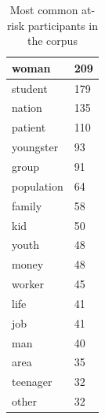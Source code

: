 \begin{table}[htb!]
{\begin{minipage}{.37\textwidth}
\begin{tabularx}{1.0\textwidth}{|X|l|}
    woman      & 209   \\ \hline
    student    & 179   \\ \hline
    nation     & 135   \\ \hline
    patient    & 110   \\ \hline
    youngster  & 93    \\ \hline
    group      & 91    \\ \hline
    population & 64    \\ \hline
    family     & 58    \\ \hline
    kid        & 50    \\ \hline
    youth      & 48    \\ \hline
    money      & 48    \\ \hline
    worker     & 45    \\ \hline
    life       & 41    \\ \hline
    job        & 41    \\ \hline
    man        & 40    \\ \hline
    area       & 35    \\ \hline
    teenager   & 32    \\ \hline
    other & 32 \\ \hline
    \end{tabularx}
    \caption{Most common at-risk participants in the corpus}
    \label{tab:atrisk}
    \end{minipage}}%
    \end{table}

